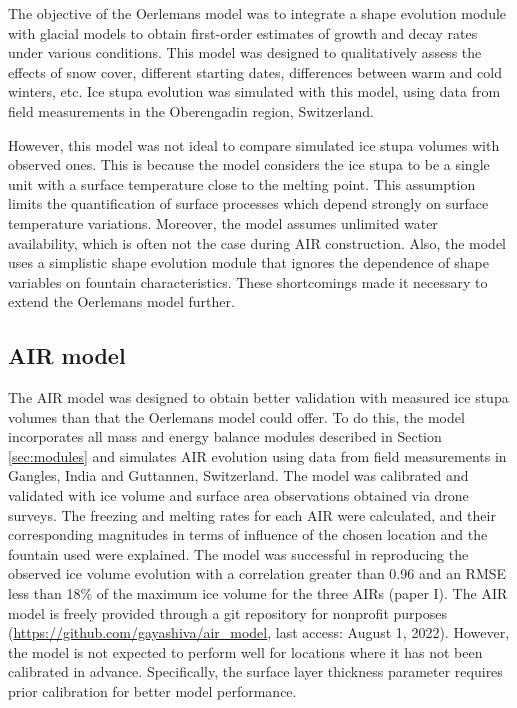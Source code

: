 The objective of the Oerlemans model was to integrate a shape evolution module with glacial models to obtain
first-order estimates of growth and decay rates under various conditions. This model was designed to
qualitatively assess the effects of snow cover, different starting dates, differences between warm and cold
winters, etc. Ice stupa evolution was simulated with this model, using data from field measurements in the Oberengadin region, Switzerland. 

However, this model was not ideal to compare simulated ice stupa volumes with observed ones. This is
because the model considers the ice stupa to be a single unit with a surface temperature close to the melting
point. This assumption limits the quantification of surface processes which depend strongly on surface
temperature variations. Moreover, the model assumes unlimited water availability, which is often not the case
during \ac{AIR} construction. Also, the model uses a simplistic shape evolution module that ignores the dependence of
shape variables on fountain characteristics. These shortcomings made it necessary to extend the Oerlemans
model further.

\subsection{AIR model}

The \ac{AIR} model was designed to obtain better validation with measured ice stupa volumes than that the Oerlemans model could offer. To do this, the model incorporates all mass and energy balance modules described in Section
\ref{sec:modules} and simulates \ac{AIR} evolution using data from field measurements in Gangles, India and
Guttannen, Switzerland. The model was calibrated and validated with ice volume and surface area observations
obtained via drone surveys. The freezing and melting rates for each \ac{AIR} were calculated, and
their corresponding magnitudes in terms of influence of the chosen location and the fountain used were explained.
The model was successful in reproducing the observed ice volume evolution with a correlation greater than 0.96
and an \ac{RMSE} less than 18\% of the maximum ice volume for the three \ac{AIRs} (paper I). The \ac{AIR} model is freely
provided through a git repository for nonprofit purposes (\url{https://github.com/gayashiva/air_model}, last
access: August 1, 2022). However, the model is not expected to perform well for locations where it has not been calibrated in advance. Specifically, the surface layer thickness parameter requires prior calibration for better model performance.


